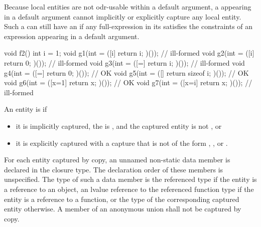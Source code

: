 \pnum
\begin{note}
Because local entities are not
odr-usable within a default argument,
a  appearing in a default argument
cannot implicitly or explicitly capture any local entity.
Such a 
can still have an  if
any full-expression in its 
satisfies the constraints of an expression appearing in
a default argument.
\end{note}
\begin{example}
\begin{codeblock}
void f2() {
  int i = 1;
  void g1(int = ([i]{ return i; })());          // ill-formed
  void g2(int = ([i]{ return 0; })());          // ill-formed
  void g3(int = ([=]{ return i; })());          // ill-formed
  void g4(int = ([=]{ return 0; })());          // OK
  void g5(int = ([]{ return sizeof i; })());    // OK
  void g6(int = ([x=1]{ return x; })());        // OK
  void g7(int = ([x=i]{ return x; })());        // ill-formed
}
\end{codeblock}
\end{example}

\pnum
An entity is  if
\begin{itemize}
\item
it is implicitly captured,
the  is \tcode{=}, and
the captured entity is not , or
\item
it is explicitly captured with a capture that is not of the form
,
\tcode{\&} , or
\tcode{\&}  .
\end{itemize}
For each entity captured by copy, an
unnamed non-static data member is declared in the closure type. The declaration order of
these members is unspecified. The type of such a data member is
the referenced type if the entity is a reference to an object,
an lvalue reference to the referenced function type if the entity is a reference to a function, or
the type of the corresponding captured entity otherwise.
A member of an anonymous union shall not be captured by copy.

